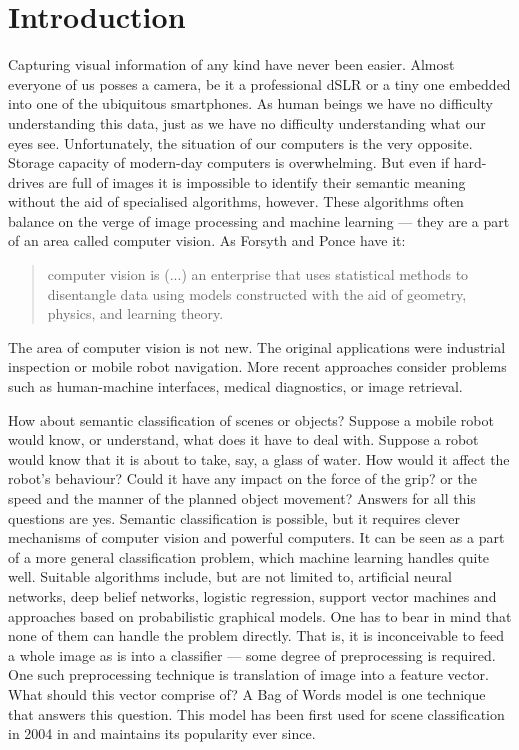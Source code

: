\chapter{Introduction}

	Capturing visual information of any kind have never been easier. Almost everyone of us posses a camera, be it a professional dSLR or a tiny one embedded into one of the ubiquitous smartphones. As human beings we have no difficulty understanding this data, just as we have no difficulty understanding what our eyes see. Unfortunately, the situation of our computers is the very opposite. Storage capacity of modern-day computers is overwhelming.  But even if hard-drives are full of images it is impossible to identify their semantic meaning without the aid of specialised algorithms, however. These algorithms often balance on the verge of image processing and machine learning --- they are a part of an area called computer vision. As Forsyth and Ponce \cite{ponce2011cv} have it: \begin{quote} computer vision is (...) an enterprise that uses statistical methods to disentangle data using models constructed with the aid of geometry, physics, and learning theory.\end{quote} The area of computer vision is not new. The original applications were industrial inspection or mobile robot navigation. More recent approaches consider problems such as human-machine interfaces, medical diagnostics, or image retrieval.
	
	How about semantic classification of scenes or objects? Suppose a mobile robot would know, or understand, what does it have to deal with. Suppose a robot would know that it is about to take, say, a glass of water. How would it affect the robot's behaviour? Could it have any impact on the force of the grip? or the speed and the manner of the planned object movement? Answers for all this questions are yes. Semantic classification is possible, but it requires clever mechanisms of computer vision and powerful computers. It can be seen as a part of a more general classification problem, which machine learning handles quite well. Suitable algorithms include, but are not limited to, artificial neural networks, deep belief networks, logistic regression, support vector machines and approaches based on probabilistic graphical models. One has to bear in mind that none of them can handle the problem directly. That is, it is inconceivable to feed a whole image as is into a classifier --- some degree of preprocessing is required. One such preprocessing technique is translation of image into a feature vector. What should this vector comprise of? A Bag of Words model is one technique that answers this question. This model has been first used for scene classification in 2004 in \cite{csurka2004visual} and maintains its popularity ever since.
	
